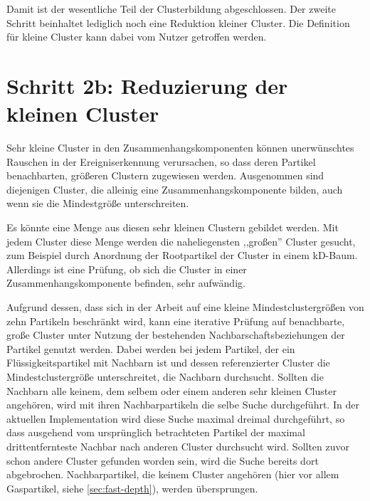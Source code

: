 Damit ist der wesentliche Teil der Clusterbildung abgeschlossen. Der zweite Schritt beinhaltet lediglich noch eine Reduktion kleiner Cluster. Die Definition für kleine Cluster kann dabei vom Nutzer getroffen werden.



\section{Schritt 2b: Reduzierung der kleinen Cluster}\label{sec:clusterreduktion}

Sehr kleine Cluster in den Zusammenhangskomponenten können unerwünschtes Rauschen in der Ereigniserkennung verursachen, so dass deren Partikel benachbarten, größeren Clustern zugewiesen werden. Ausgenommen sind diejenigen Cluster, die alleinig eine Zusammenhangskomponente bilden, auch wenn sie die Mindestgröße unterschreiten.

Es könnte eine Menge aus diesen sehr kleinen Clustern gebildet werden. Mit jedem Cluster diese Menge werden die naheliegensten ,,großen'' Cluster gesucht, zum Beispiel durch Anordnung der Rootpartikel der Cluster in einem kD-Baum. Allerdings ist eine Prüfung, ob sich die Cluster in einer Zusammenhangskomponente befinden, sehr aufwändig.

Aufgrund dessen, dass sich in der Arbeit auf eine kleine Mindestclustergrößen von zehn Partikeln beschränkt wird, kann eine iterative Prüfung auf benachbarte, große Cluster unter Nutzung der bestehenden Nachbarschaftsbeziehungen der Partikel genutzt werden. Dabei werden bei jedem Partikel, der ein Flüssigkeitspartikel mit Nachbarn ist und dessen referenzierter Cluster die Mindestclustergröße unterschreitet, die Nachbarn durchsucht. Sollten die Nachbarn alle keinem, dem selbem oder einem anderen sehr kleinen Cluster angehören, wird mit ihren Nachbarpartikeln die selbe Suche durchgeführt. In der aktuellen Implementation wird diese Suche maximal dreimal durchgeführt, so dass ausgehend vom ursprünglich betrachteten Partikel der maximal drittentfernteste Nachbar nach anderen Cluster durchsucht wird. Sollten zuvor schon andere Cluster gefunden worden sein, wird die Suche bereits dort abgebrochen. Nachbarpartikel, die keinem Cluster angehören (hier vor allem Gaspartikel, siehe \autoref{sec:fast-depth}), werden übersprungen.

